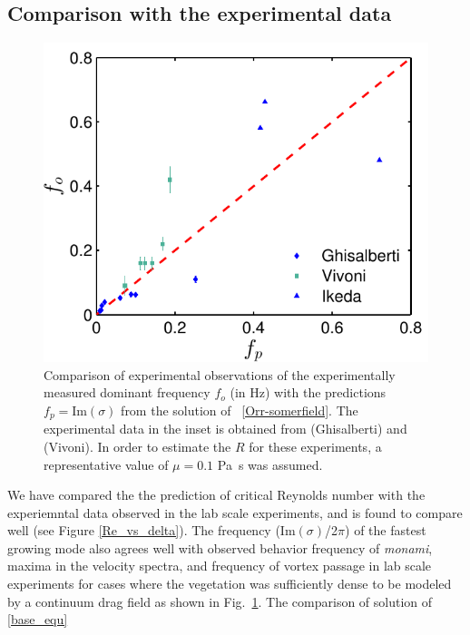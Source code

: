 \documentclass[12pt]{report}   %
\newcommand{\Rey}{{R}}
\newcommand{\monami}{\textit{monami}}
\begin{document}
\subsection{Comparison with the experimental data}
\begin{figure}
\centerline{\includegraphics[]{new_graph_freq}}
\caption{Comparison of experimental observations of the experimentally measured dominant frequency $f_o$ (in Hz) with the predictions $f_p=\text{Im}(\sigma)$ from the solution of ~\eqref{Orr-somerfield}. 
The experimental data in the inset is obtained from \cite{Ghisal02} (Ghisalberti) and \cite{Vivoni98} (Vivoni). 
In order to estimate the $\Rey$ for these experiments, a representative value of $\mu=0.1$ Pa~s was assumed.
}
\label{frequency_comparison}
\end{figure}
We have compared the the prediction of critical Reynolds number with the experiemntal data observed in the lab scale experiments, and is found to compare well \cite{Ghisal02} (see Figure \ref{Re_vs_delta}). The frequency (Im$(\sigma)$/2$\pi$) of the fastest growing mode also agrees well with observed behavior frequency of \monami, maxima in the velocity spectra, and frequency of vortex passage in lab scale experiments \cite{Ghisal02} for cases where the vegetation was sufficiently dense to be modeled by a continuum drag field as shown in Fig.~\ref{frequency_comparison}. The comparison of solution of \eqref{base_equ}
\end{document}
